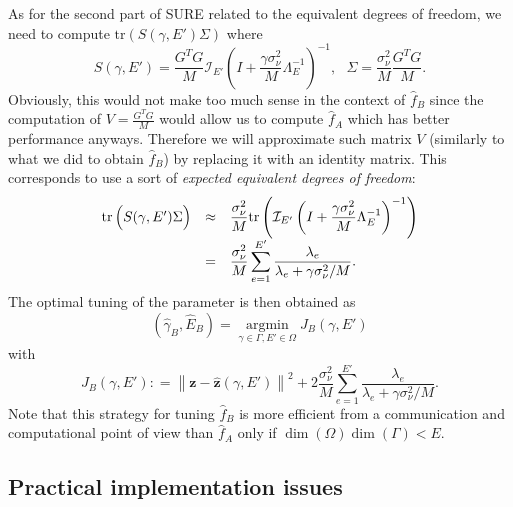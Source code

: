 \documentclass[10pt,twocolumn,twoside]{IEEEtran}					%
\theoremstyle	{plain}
\newcommand{\TraceOf}				[1]	{\mathrm{tr} \left( #1 \right)}
\newcommand{\DefinedAs}			[0]	{\mathrel{\mathop:}=}
\begin{document}
As for the second part of \ac{SURE} related to the equivalent degrees of freedom, we need to compute $\TraceOf{S(\gamma,E') \Sigma}$ where
%
\begin{equation}
	S(\gamma,E')
	= 
	\frac{G^{T} G}{M} \mathcal{I}_{E'} \left( I + \frac{\gamma \sigma^{2}_{\nu}}{M} \Lambda^{-1}_{E} \right)^{-1}, \ \ \ \Sigma = \frac{\sigma_{\nu}^2}{M}\frac{G^TG}{M}.
	\label{equ:S_for_distributed_SURE2}
\end{equation}
%
Obviously, this would not make too much sense in the context of $\widehat{f}_B$ since the computation of $V=\frac{G^TG}{M}$ would allow us to compute $\widehat{f}_A$ which has better performance anyways. Therefore we will approximate such matrix $V$ (similarly to what we did to obtain $\widehat{f}_B$) by replacing it with an identity matrix. This corresponds to use a sort of \emph{expected equivalent degrees of freedom}:
$$
\begin{array}{lll}
	\TraceOf{ \rule{0cm}{0.4cm} S(\gamma,E') \Sigma}
	&\approx&
	\displaystyle
	\frac{\sigma^{2}_{\nu}}{M}\TraceOf{\mathcal{I}_{E'} \left( I + \frac{\gamma \sigma^{2}_{\nu}}{M} \Lambda^{-1}_{E} \right)^{-1}} \\
	&=&
	\displaystyle
	\frac{\sigma^{2}_{\nu}}{M} 
	\sum_{e=1}^{E'} \frac{\lambda_e}{\lambda_e + \gamma \sigma^{2}_{\nu}/M} . \\
\end{array}
$$
The optimal tuning of the parameter is then obtained as
\begin{equation}
	\left( \widehat \gamma_B, \widehat{E}_B \right)
	=
	\operatorname*{\mathrm{argmin}}_{\gamma \in \Gamma,E'\in \Omega}
	J_{B} \left( \gamma, E' \right)
	\label{equ:SURE_B}
\end{equation}
with
\begin{equation}
	J_{B} \left( \gamma, E' \right)
	\DefinedAs
	\left\| \bm{z} - \widehat{\bm{z}}(\gamma,E') \right\|^{2}
	+
	2
	\frac{\sigma^{2}_{\nu}}{M}
	\sum_{e=1}^{E'} \frac{\lambda_e}{\lambda_e+ \gamma \sigma^{2}_{\nu}/M} .
	\label{equ:definition-of-J-B}
\end{equation}
%
Note that this strategy for tuning $\widehat{f}_B$ is more efficient from a communication and computational point of view than $\widehat{f}_A$ only if $\dim(\Omega) \dim(\Gamma)<E$.


\subsection{Practical implementation issues}
\label{InPractice}
\end{document}
